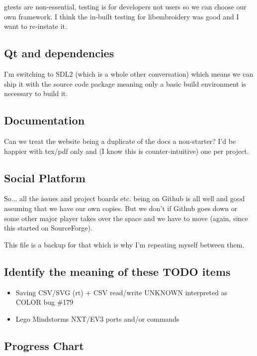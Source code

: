 \documentclass{report}
\begin{document}
gtests are non-essential, testing is for developers not users so we can
choose our own framework. I think the in-built testing for libembroidery
was good and I want to re-instate it.

\subsection{Qt and dependencies}

I'm switching to SDL2 (which is a whole other conversation) which means
we can ship it with the source code package meaning only a basic build
environment is necessary to build it.

\subsection{Documentation}

Can we treat the website being a duplicate of the docs a non-starter?
I'd be happier with tex/pdf only and (I know this is counter-intuitive)
one per project.

\subsection{Social Platform}

So... all the issues and project boards etc. being on Github is all
well and good assuming that we have our own copies. But we don't if
Github goes down or some other major player takes over the space and we
have to move (again, since this started on SourceForge).

This file is a backup for that which is why I'm repeating myself between
them.

\subsection{Identify the meaning of these TODO items}

\begin{itemize}
\item Saving CSV/SVG (rt) + CSV read/write UNKNOWN interpreted as COLOR bug \#179
\item Lego Mindstorms NXT/EV3 ports and/or commands
\end{itemize}

\subsection{Progress Chart}
\end{document}
